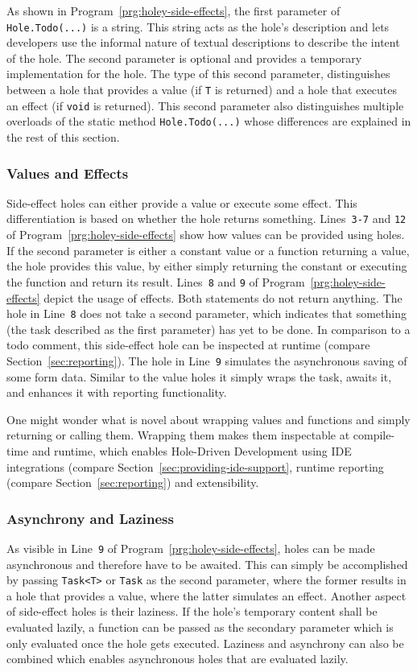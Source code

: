 As shown in Program~\ref{prg:holey-side-effects}, the first parameter of \verb|Hole.Todo(...)| is a string.
This string acts as the hole's description and lets developers use the informal nature of textual descriptions to describe the intent of the hole.
The second parameter is optional and provides a temporary implementation for the hole.
The type of this second parameter, distinguishes between a hole that provides a value (if \verb|T| is returned) and a hole that executes an effect (if \verb|void| is returned).
This second parameter also distinguishes multiple overloads of the static method \verb|Hole.Todo(...)| whose differences are explained in the rest of this section.

\subsubsection{Values and Effects}
Side-effect holes can either provide a value or execute some effect.
This differentiation is based on whether the hole returns something.
Lines~\verb|3-7| and \verb|12| of Program~\ref{prg:holey-side-effects} show how values can be provided using holes.
If the second parameter is either a constant value or a function returning a value, the hole provides this value, by either simply returning the constant or executing the function and return its result.
Lines~\verb|8| and \verb|9| of Program~\ref{prg:holey-side-effects} depict the usage of effects.
Both statements do not return anything.
The hole in Line~\verb|8| does not take a second parameter, which indicates that something (the task described as the first parameter) has yet to be done.
In comparison to a todo comment, this side-effect hole can be inspected at runtime (compare Section~\ref{sec:reporting}).
The hole in Line~\verb|9| simulates the asynchronous saving of some form data.
Similar to the value holes it simply wraps the task, awaits it, and enhances it with reporting functionality.

One might wonder what is novel about wrapping values and functions and simply returning or calling them.
Wrapping them makes them inspectable at compile-time and runtime, which enables Hole-Driven Development using IDE integrations (compare Section~\ref{sec:providing-ide-support}, runtime reporting (compare Section~\ref{sec:reporting}) and extensibility.

\subsubsection{Asynchrony and Laziness}
As visible in Line~\verb|9| of Program~\ref{prg:holey-side-effects}, holes can be made asynchronous and therefore have to be awaited.
This can simply be accomplished by passing \verb|Task<T>| or \verb|Task| as the second parameter, where the former results in a hole that provides a value, where the latter simulates an effect.
Another aspect of side-effect holes is their laziness.
If the hole's temporary content shall be evaluated lazily, a function can be passed as the secondary parameter which is only evaluated once the hole gets executed.
Laziness and asynchrony can also be combined which enables asynchronous holes that are evaluated lazily.

